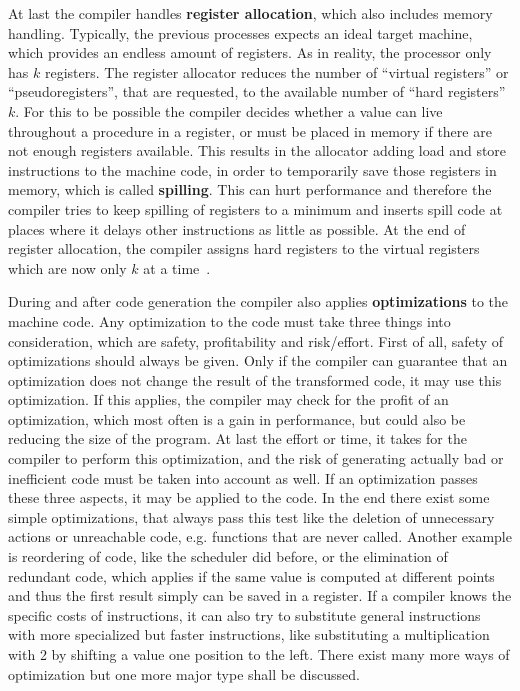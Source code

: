 {At last the compiler handles \textbf{register allocation}, which also includes memory handling.
Typically, the previous processes expects an ideal target machine, which provides an endless amount of registers.
As in reality, the processor only has $k$ registers.
The register allocator reduces the number of ``virtual registers'' or ``pseudoregisters'', that are requested, to the available number of ``hard registers'' $k$.
For this to be possible the compiler decides whether a value can live throughout a procedure in a register, or must be placed in memory if there are not enough registers available.
This results in the allocator adding load and store instructions to the machine code, in order to temporarily save those registers in memory, which is called \textbf{spilling}.
This can hurt performance and therefore the compiler tries to keep spilling of registers to a minimum and inserts spill code at places where it delays other instructions as little as possible.
At the end of register allocation, the compiler assigns hard registers to the virtual registers which are now only $k$ at a time~\cite{UBHD-67548259, UBHD-66483012}.

During and after code generation the compiler also applies \textbf{optimizations} to the machine code.
Any optimization to the code must take three things into consideration, which are safety, profitability and risk/effort.
First of all, safety of optimizations should always be given.
Only if the compiler can guarantee that an optimization does not change the result of the transformed code, it may use this optimization.
If this applies, the compiler may check for the profit of an optimization, which most often is a gain in performance, but could also be reducing the size of the program.
At last the effort or time, it takes for the compiler to perform this optimization, and the risk of generating actually bad or inefficient code must be taken into account as well.
If an optimization passes these three aspects, it may be applied to the code.
In the end there exist some simple optimizations, that always pass this test like the deletion of unnecessary actions or unreachable code, e.g. functions that are never called.
Another example is reordering of code, like the scheduler did before, or the elimination of redundant code, which applies if the same value is computed at different points and thus the first result simply can be saved in a register.
If a compiler knows the specific costs of instructions, it can also try to substitute general instructions with more specialized but faster instructions, like substituting a multiplication with 2 by shifting a value one position to the left.
There exist many more ways of optimization but one more major type shall be discussed.

}

